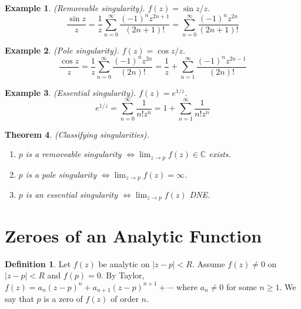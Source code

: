 \documentclass{article}
\newtheorem{theorem}{Theorem}[section]
\newtheorem{example}[theorem]{Example}
\theoremstyle{definition}
\newtheorem{definition}{Definition}[section]
\begin{document}
\begin{example} \normalfont
    (Removeable singularity). $f(z) = \sin z / z$.
    \begin{equation*}
        \frac{\sin z}{z} = \frac{1}{z} \sum_{n=0}^\infty \frac{(-1)^n z^{2n+1}}{(2n+1)!} = \sum_{n=0}^\infty \frac{(-1)^n z^{2n}}{(2n+1)!}
    \end{equation*}
\end{example}

\begin{example} \normalfont
    (Pole singularity). $f(z) = \cos z / z$.
    \begin{equation*}
        \frac{\cos z}{z} = \frac{1}{z} \sum_{n=0}^\infty \frac{(-1)^n z^{2n}}{(2n)!} = \frac{1}{z} + \sum_{n=1}^\infty \frac{(-1)^n z^{2n-1}}{(2n)!}
    \end{equation*}
\end{example}

\begin{example} \normalfont
    (Essential singularity). $f(z) = e^{1/z}$.
    \begin{equation*}
        e^{1/z} = \sum_{n=0}^\infty \frac{1}{n! z^n} = 1 + \sum_{n=1}^\infty \frac{1}{n!z^n}
    \end{equation*}
\end{example}

\begin{theorem}
    (Classifying singularities).
    \begin{enumerate}
        \item $p$ is a removeable singularity $\iff \lim_{z \to p} f(z) \in \mathbb{C}$ exists.
        \item $p$ is a pole singularity $\iff \lim_{z \to p} f(z) = \infty$.
        \item $p$ is an essential singularity $\iff \lim_{z \to p} f(z)$ DNE.
    \end{enumerate}
\end{theorem}

\section{Zeroes of an Analytic Function}

\begin{definition}
    Let $f(z)$ be analytic on $|z-p| < R$. Assume $f(z) \neq 0$ on $|z-p| < R$ and $f(p) = 0$. By Taylor, $f(z) = a_n (z-p)^n + a_{n+1} (z-p)^{n+1} + \cdots$ where $a_n \neq 0$ for some $n \geq 1$. We say that $p$ is a zero of $f(z)$ of order $n$.
\end{definition}
\end{document}
